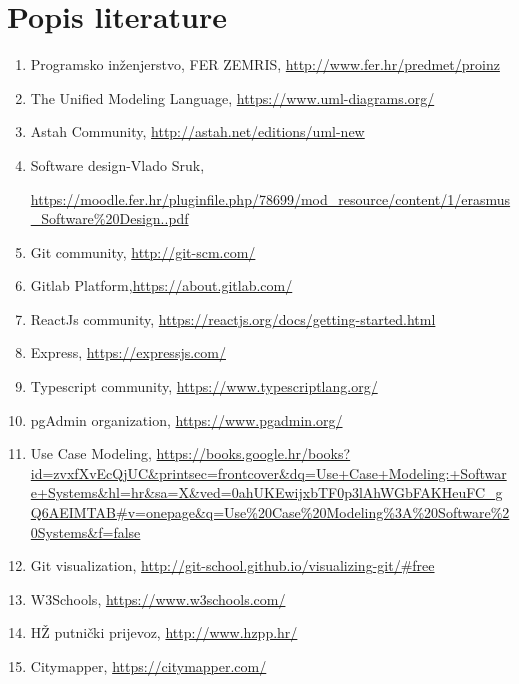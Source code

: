 \chapter*{Popis literature}
	 	
		
		\begin{enumerate}
			
			
			\item  Programsko inženjerstvo, FER ZEMRIS, \url{http://www.fer.hr/predmet/proinz}
			
			\item  The Unified Modeling Language, \url{https://www.uml-diagrams.org/}
			
			\item  Astah Community, \url{http://astah.net/editions/uml-new}
			
			\item Software design-Vlado Sruk,
			
			\url {https://moodle.fer.hr/pluginfile.php/78699/mod_resource/content/1/erasmus_Software%20Design..pdf}
			
			\item Git community, \url{http://git-scm.com/}
			
			\item Gitlab Platform,\url{https://about.gitlab.com/}
			
			\item ReactJs community,  \url{https://reactjs.org/docs/getting-started.html}
			
			\item Express, \url{https://expressjs.com/}
			
			\item Typescript community, \url{https://www.typescriptlang.org/}
			
			\item pgAdmin organization, \url{https://www.pgadmin.org/}
			
			\item Use Case Modeling, \url{https://books.google.hr/books?id=zvxfXvEcQjUC&printsec=frontcover&dq=Use+Case+Modeling:+Software+Systems&hl=hr&sa=X&ved=0ahUKEwijxbTF0p3lAhWGbFAKHeuFC_gQ6AEIMTAB#v=onepage&q=Use%20Case%20Modeling%3A%20Software%20Systems&f=false}
			
			\item Git visualization, \url{http://git-school.github.io/visualizing-git/#free}
			
			\item W3Schools, \url{https://www.w3schools.com/}

			\item HŽ putnički prijevoz, \url{http://www.hzpp.hr/}

			\item Citymapper, \url{https://citymapper.com/}
			
		\end{enumerate}
		
		 